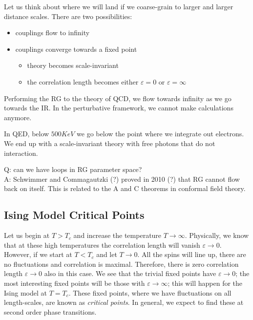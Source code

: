 Let us think about where we will land if we coarse-grain to larger and larger distance scales.
There are two possibilities:
\begin{itemize}
  \item couplings flow to infinity
  \item couplings converge towards a fixed point
    \begin{itemize}
      \item theory becomes scale-invariant
      \item the correlation length becomes either $\varepsilon = 0$ or $\varepsilon = \infty$
    \end{itemize}
\end{itemize}
\begin{example}[]
  Performing the RG to the theory of QCD, we flow towards infinity as we go towards the IR. In the perturbative framework, we cannot make calculations anymore.
\end{example}
\begin{example}
  In QED, below $500 KeV$ we go below the point where we integrate out electrons. We end up with a scale-invariant theory with free photons that do not interaction.
\end{example}
\begin{leftbar}
  \begin{remark}
    Q: can we have loops in RG parameter space?\\
    A: Schwimmer and Commagautzki (?) proved in 2010 (?) that RG cannot flow back on itself.
    This is related to the A and C theorems in conformal field theory.
  \end{remark}
\end{leftbar}

\subsection{Ising Model Critical Points}%
\label{sub:ising_model_critical_points}

Let us begin at $T > T_c$ and increase the temperature $T \to \infty$. Physically, we know that at these high temperatures the correlation length will vanish $\varepsilon \to 0$.
However, if we start at $T < T_c$ and let $T \to 0$. All the spins will line up, there are no fluctuations and correlation is maximal. Therefore, there is zero correlation length $\varepsilon \to 0$ also in this case.
We see that the trivial fixed points have $\varepsilon \to 0$; the most interesting fixed points will be those with $\varepsilon \to \infty$; this will happen for the Ising model at $T = T_c$.
These fixed points, where we have fluctuations on all length-scales, are known as \emph{critical points}.
In general, we expect to find these at second order phase transitions.


